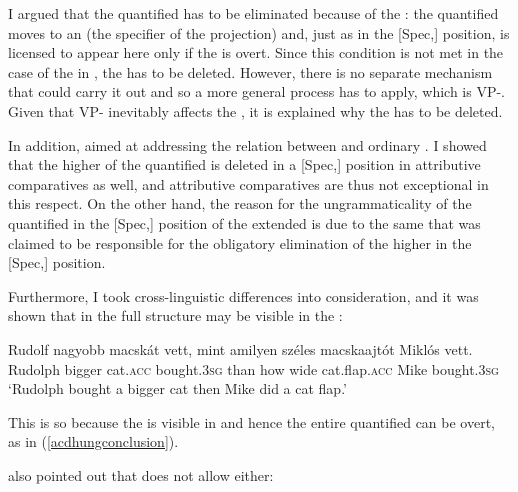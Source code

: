 I argued that the quantified  has to be eliminated because of the : the quantified  moves to an  (the specifier of the  projection) and, just as in the [Spec,] position,  is licensed to appear here only if the  is overt. Since this condition is not met in the case of the  in , the  has to be deleted. However, there is no separate mechanism that could carry it out and so a more general process has to apply, which is VP-. Given that VP- inevitably affects the , it is explained why the  has to be deleted.

In addition,  aimed at addressing the relation between  and ordinary . I showed that the higher  of the quantified  is deleted in a [Spec,] position in attributive comparatives as well, and attributive comparatives are thus not exceptional in this respect. On the other hand, the reason for the ungrammaticality of the quantified  in the [Spec,] position of the extended  is due to the same  that was claimed to be responsible for the obligatory elimination of the higher  in the [Spec,] position.

Furthermore, I took cross-linguistic differences into consideration, and it was shown that in  the full structure may be visible in the :

\ea \label{acdhungconclusion}
\gll Rudolf nagyobb macsk\'at vett, mint amilyen sz\'eles macskaajt\'ot Mikl\'os vett.\\
Rudolph bigger cat.\textsc{acc}	bought.\textsc{3sg} than how wide cat.flap.\textsc{acc}	Mike	bought.\textsc{3sg}\\
\glt `Rudolph bought a bigger cat then Mike did a cat flap.'
\z

This is so because the  is visible in  and hence the entire quantified  can be overt, as in (\ref{acdhungconclusion}).

 also pointed out that  does not allow  either:

\z

